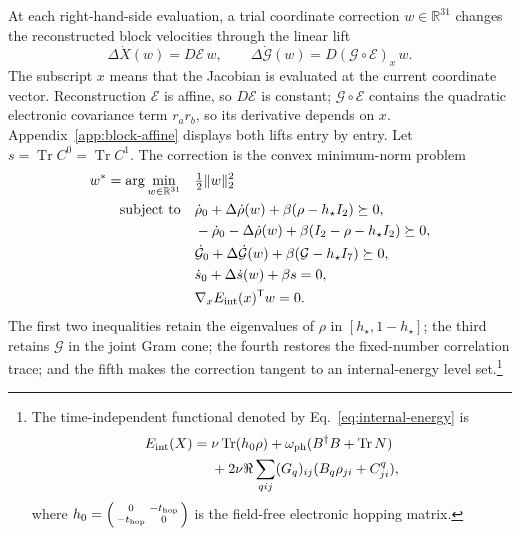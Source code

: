 \documentclass[10pt,twocolumn]{article}
\newcommand{\R}{\mathbb R}
\newcommand{\I}{I}
\newcommand{\Tr}{\operatorname{Tr}}
\newcommand{\norm}[1]{\lVert#1\rVert}
\begin{document}
At each right-hand-side evaluation, a trial coordinate correction
$w\in\R^{31}$ changes the reconstructed block velocities through the linear
lift
\begin{equation}
\Delta\dot X(w)=D\mathcal E\,w,\qquad
\Delta\dot{\mathcal G}(w)=D(\mathcal G\circ\mathcal E)_x\,w.
\label{eq:correction-lift}
\end{equation}
The subscript $x$ means that the Jacobian is evaluated at the current
coordinate vector.  Reconstruction $\mathcal E$ is affine, so
$D\mathcal E$ is constant; $\mathcal G\circ\mathcal E$ contains the quadratic
electronic covariance term $r_ar_b$, so its derivative depends on $x$.
Appendix~\ref{app:block-affine} displays both lifts entry by entry.  Let
$s=\Tr C^0=\Tr C^1$.
\label{eq:internal-energy}
The correction is the convex minimum-norm problem~\cite{vandenbergheBoyd1996}
{\footnotesize
\begin{equation}
\begin{aligned}
w^*=\arg\min_{w\in\R^{31}}\quad&\tfrac12\norm{w}_2^2\\
\text{subject to}\quad
&\dot\rho_0+\Delta\dot\rho(w)+\beta(\rho-h_\star\I_2)\succeq0,\\
&-\dot\rho_0-\Delta\dot\rho(w)
+\beta(\I_2-\rho-h_\star\I_2)\succeq0,\\
&\dot{\mathcal G}_0+\Delta\dot{\mathcal G}(w)
+\beta(\mathcal G-h_\star\I_7)\succeq0,\\
&\dot s_0+\Delta\dot s(w)+\beta s=0,\\
&\nabla_xE_{\rm int}(x)^{\mathsf T}w=0.
\end{aligned}
\label{eq:correction-sdp}
\end{equation}}
The first two inequalities retain the eigenvalues of $\rho$ in
$[h_\star,1-h_\star]$; the third retains $\mathcal G$ in the joint Gram
cone; the fourth restores the fixed-number correlation trace; and the fifth
makes the correction tangent to an internal-energy level set.\footnote{The
time-independent functional denoted by Eq.~\eqref{eq:internal-energy} is
\[
\begin{aligned}
E_{\rm int}(X)={}&\nu\Tr(h_0\rho)
+\omega_{\rm ph}(B^\dagger B+\Tr N)\\
&+2\nu\Re\sum_{qij}(G_q)_{ij}(B_q\rho_{ji}+C^q_{ji}),
\end{aligned}
\]
where
$h_0=\left(\begin{smallmatrix}0&-t_{\rm hop}\\-t_{\rm hop}&0\end{smallmatrix}\right)$
is the field-free electronic hopping matrix.}
\end{document}
